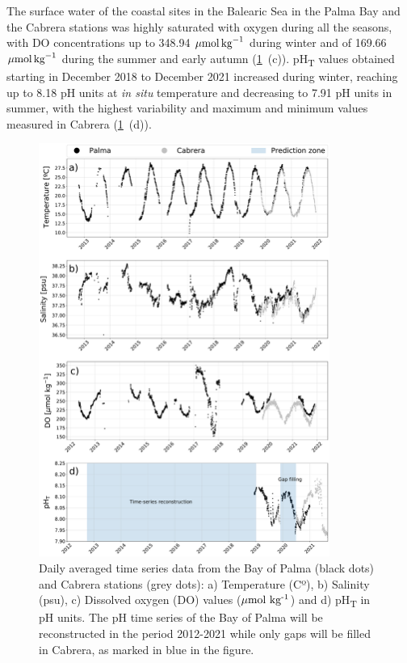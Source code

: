 The surface water of the coastal sites in the Balearic Sea in the Palma Bay
and the Cabrera stations was highly saturated with oxygen during all the
seasons, with DO concentrations up to  348.94 ${\mu \textrm{mol\,kg}^{-1}}$
during winter and of 169.66 ${\mu \textrm{mol\,kg}^{-1}}$ during the summer and
early autumn (\cref{fig:data}~\textcolor{ref_color}{(c)}). pH\textsubscript{T}
values obtained starting
in December 2018 to December 2021 increased during winter, reaching up to 8.18
pH units at \emph{in situ} temperature and decreasing to 7.91 pH units in
summer, with the highest variability and maximum and minimum values measured in
Cabrera (\cref{fig:data}~\textcolor{ref_color}{(d)}).

\begin{figure}[H]
    \centering
    \includegraphics[width=0.85\textwidth]{Figures/Data_study.pdf}
    \caption[Daily averaged time series data from the Bay of Palma and Cabrera
        stations]{Daily averaged time series data from the Bay of Palma (black
        dots)
        and Cabrera stations (grey dots): a) Temperature (Cº), b) Salinity
        (psu), c) Dissolved oxygen (DO) values (${\mu\textrm{mol
                        kg}\textsuperscript{-1}}$) and d) pH\textsubscript{T}
        in pH units. The pH time series of the Bay of Palma will be
        reconstructed in the period 2012-2021 while only gaps will be filled in
        Cabrera, as marked in blue in the figure.}
    \label{fig:data}
\end{figure}

